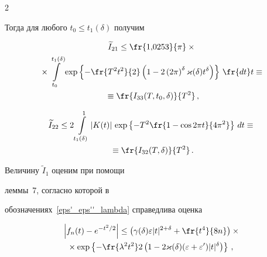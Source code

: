 \begin{multicols}{2}
\begin{equation}
\label{choice T_t1}


\end{equation}


Тогда для любого $t_0\le t_1(\delta)$ получим


\begin{multline*} %


\widetilde I_{21} \le


\fr{1{,}0253}{\pi}\times{}\\


{}\times


\int\limits_{t_0}^{t_1(\delta)}


\exp\left\{-\fr{T^2t^2}{2}\left(1-2\left(2\pi\right)^\delta \varkappa(\delta)t^\delta\right)\right\}


\,\fr{dt}t\equiv{}\\


{}\equiv


 \fr{I_{33}(T,t_0,\delta)}{T^2}\,,


\end{multline*}


\begin{multline*}%


\widetilde I_{22} \le2\int\limits_{t_1(\delta)}^1|K(t)|\,


\exp\left\{-T^2\fr{1-\cos 2\pi t}{4\pi^2}\right\} \,dt\equiv{}\\


{}\equiv


\fr{I_{32}(T,\delta)}{T^2}\,.


\end{multline*}





Величину $\widetilde I_1$ оценим при помощи


леммы~7, согласно которой в


обозначениях~\eqref{eps'_eps''_lambda} справедлива оценка


\begin{multline*}


\left|f_n(t)- e^{-t^2/2}\right|


\le \left(\gamma(\delta)\varepsilon |t|^{2+\delta}+


\fr{t^4}{8n}\right)\times{}\\


{}\times


 \exp\left\{-\fr{\lambda^2t^2}2 \left(1-


2\varkappa(\delta)(\varepsilon+\varepsilon')|t|^{\delta} \right)\right\}\,,\enskip



\end{multline*}
\end{multicols}
